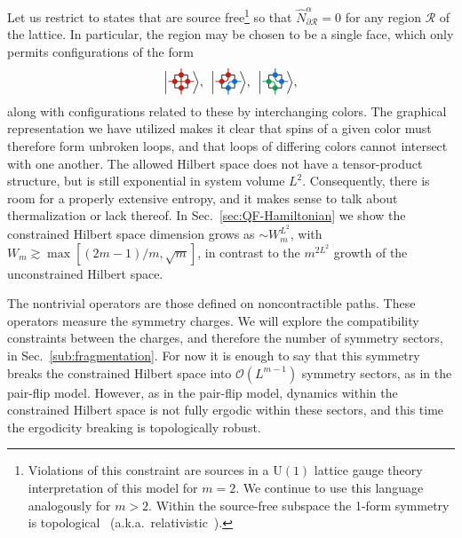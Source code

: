 Let us restrict to states that are source free\footnote{Violations of this constraint are sources in a $\text{U}(1)$ lattice gauge theory interpretation of this model for $m=2$. We continue to use this language analogously for $m>2$. Within the source-free subspace the 1-form symmetry is topological~\cite{Qi2021Exotic} (a.k.a.~relativistic~\cite{Seiberg2020Field}).} so that $\hat{N}^\alpha_{\partial \mathcal{R}}=0$ for any region $\mathcal{R}$ of the lattice. In particular, the region may be chosen to be a single face, which only permits configurations of the form
%
%
\begin{equation}
    \RRsite, \:\: \RBsite , \:\: \BGsite ,
    \label{eqn:allowed-faces}
\end{equation}
%
%
along with configurations related to these by interchanging colors. The graphical representation we have utilized makes it clear that spins of a given color must therefore form unbroken loops, and that loops of differing colors cannot intersect with one another. 
The allowed Hilbert space does not have a tensor-product structure, but is still exponential in system volume $L^2$. Consequently, there is room for a properly extensive entropy, and it makes sense to talk about thermalization or lack thereof. 
In Sec.~\ref{sec:QF-Hamiltonian} we show the constrained Hilbert space dimension grows as $\sim W_m^{L^2}$, with $W_m \gtrsim \max[(2m-1)/m, \sqrt{m}]$, in contrast to the $m^{2L^2}$ growth of the unconstrained Hilbert space.

The nontrivial operators are those defined on noncontractible paths. These operators measure the symmetry charges. We will explore the compatibility constraints between the charges, and therefore the number of symmetry sectors, in Sec.~\ref{sub:fragmentation}. For now it is enough to say that this symmetry breaks the constrained Hilbert space into $\mathcal{O}(L^{m-1})$ symmetry sectors, as in the pair-flip model. However, as in the pair-flip model, dynamics within the constrained Hilbert space is not fully ergodic within these sectors, and this time the ergodicity breaking is topologically robust. 

